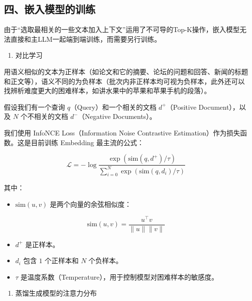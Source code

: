 \hypertarget{ux56dbux5d4cux5165ux6a21ux578bux7684ux8badux7ec3}{%
\subsection{四、嵌入模型的训练}\label{ux56dbux5d4cux5165ux6a21ux578bux7684ux8badux7ec3}}

由于``选取最相关的一些文本加入上下文''运用了不可导的Top-K操作，嵌入模型无法直接和主LLM一起端到端训练，而需要另行训练。

\begin{enumerate}
\def\labelenumi{\arabic{enumi}.}
\tightlist
\item
  对比学习
\end{enumerate}

用语义相似的文本为正样本（如论文和它的摘要、论坛的问题和回答、新闻的标题和正文等），语义不同的为负样本（批次内非正样本均可视为负样本，此外还可以找辨析难度更大的困难样本，如讲水果中的苹果和苹果手机的段落）。

假设我们有一个查询 \(q\)（Query）和一个相关的文档 \(d^+\)（Positive Document），以及 \(N\) 个不相关的文档 \(d^-\)（Negative Documents）。

我们使用 InfoNCE Loss（Information Noise Contrastive Estimation）作为损失函数。这是目前训练 Embedding 最主流的公式：

\[
\mathcal{L}=-\log \frac{\exp(\mathrm{sim}(q,d^+)/\tau)}{\sum_{i=0}^{N}\exp(\mathrm{sim}(q,d_i)/\tau)}
\]

其中：

\begin{itemize}
\tightlist
\item
  \(\mathrm{sim}(u,v)\) 是两个向量的余弦相似度：
\end{itemize}

\[
\mathrm{sim}(u,v)=\frac{u^\top v}{\lVert u\rVert\lVert v\rVert}
\]

\begin{itemize}
\tightlist
\item
  \(d^+\) 是正样本。
\item
  \(d_i\) 包含 \(1\) 个正样本和 \(N\) 个负样本。
\item
  \(\tau\) 是温度系数（Temperature），用于控制模型对困难样本的敏感度。
\end{itemize}

\begin{enumerate}
\def\labelenumi{\arabic{enumi}.}
\setcounter{enumi}{1}
\tightlist
\item
  蒸馏生成模型的注意力分布
\end{enumerate}

